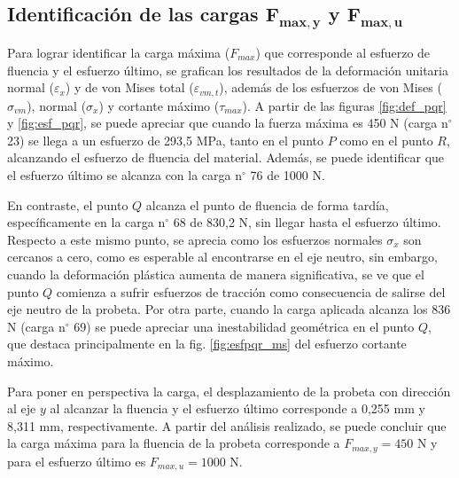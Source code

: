 \newpage

\subsection{Identificación de las cargas $\mathbf{F_{max,y}}$ y $\mathbf{F_{max,u}}$}

Para lograr identificar la carga máxima ($F_{max}$) que corresponde al esfuerzo de fluencia y el esfuerzo último, se grafican los resultados de la deformación unitaria normal ($\varepsilon_x$) y de von Mises total ($\varepsilon_{vm,t}$), además de los esfuerzos de von Mises ($\sigma_{vm}$), normal ($\sigma_x$) y cortante máximo ($\tau_{max}$). A partir de las figuras \ref{fig:def_pqr} y \ref{fig:esf_pqr}, se puede apreciar que cuando la fuerza máxima es 450 N (carga n$^{\circ}$ 23) se llega a un esfuerzo de 293,5 MPa, tanto en el punto $P$ como en el punto $R$, alcanzando el esfuerzo de fluencia del material. Además, se puede identificar que el esfuerzo último se alcanza con la carga n$^{\circ}$ 76 de 1000 N.

En contraste, el punto $Q$ alcanza el punto de fluencia de forma tardía, específicamente en la carga n$^{\circ}$ 68 de 830,2 N, sin llegar hasta el esfuerzo último. Respecto a este mismo punto, se aprecia como los esfuerzos normales $\sigma_x$ son cercanos a cero, como es esperable al encontrarse en el eje neutro, sin embargo, cuando la deformación plástica aumenta de manera significativa, se ve que el punto $Q$ comienza a sufrir esfuerzos de tracción como consecuencia de salirse del eje neutro de la probeta. Por otra parte, cuando la carga aplicada alcanza los 836 N (carga n$^{\circ}$ 69) se puede apreciar una inestabilidad geométrica en el punto $Q$, que destaca principalmente en la fig. \ref{fig:esfpqr_ms} del esfuerzo cortante máximo. 

Para poner en perspectiva la carga, el desplazamiento de la probeta con dirección al eje $y$ al alcanzar la fluencia y el esfuerzo último corresponde a 0,255 mm y 8,311 mm, respectivamente. A partir del análisis realizado, se puede concluir que la carga máxima para la fluencia de la probeta corresponde a $F_{max,y} = 450$ N y para el esfuerzo último es $F_{max,u} = 1000$ N.

